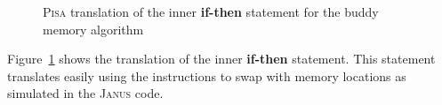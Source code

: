 \begin{figure}[ht]
    \centering
    \begin{subfigure}{.4\textwidth}
          
    \end{subfigure}
    \begin{subfigure}{.5\textwidth}
        \centering
    \end{subfigure}
    \caption{\textsc{Pisa} translation of the inner \textbf{if-then} statement for the buddy memory algorithm}
    \label{fig:pisa-buddy-inner-if}
\end{figure}

Figure~\ref{fig:pisa-buddy-inner-if} shows the translation of the inner \textbf{if-then} statement. This statement translates easily using the  instructions to swap with memory locations as simulated in the \textsc{Janus} code. 

